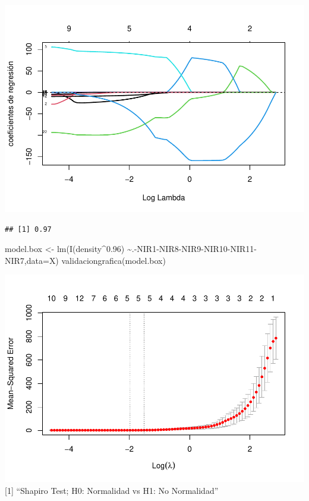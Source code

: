 \documentclass[
]{article}
\newenvironment{Shaded}{\begin{snugshade}}{\end{snugshade}}
\newcommand{\AttributeTok}[1]{\textcolor[rgb]{0.77,0.63,0.00}{#1}}
\newcommand{\FloatTok}[1]{\textcolor[rgb]{0.00,0.00,0.81}{#1}}
\newcommand{\FunctionTok}[1]{\textcolor[rgb]{0.00,0.00,0.00}{#1}}
\newcommand{\NormalTok}[1]{#1}
\newcommand{\OtherTok}[1]{\textcolor[rgb]{0.56,0.35,0.01}{#1}}
\newcommand{\SpecialCharTok}[1]{\textcolor[rgb]{0.00,0.00,0.00}{#1}}
\begin{document}
\includegraphics{Taller-2-Regresion-Multiple-Aplicada_files/figure-latex/unnamed-chunk-6-1.pdf}

\begin{verbatim}
## [1] 0.97
\end{verbatim}

\begin{Shaded}
\begin{Highlighting}[]
\NormalTok{model.box }\OtherTok{\textless{}{-}} \FunctionTok{lm}\NormalTok{(}\FunctionTok{I}\NormalTok{(density}\SpecialCharTok{\^{}}\FloatTok{0.96}\NormalTok{) }\SpecialCharTok{\textasciitilde{}}\NormalTok{.}\SpecialCharTok{{-}}\NormalTok{NIR1}\SpecialCharTok{{-}}\NormalTok{NIR8}\SpecialCharTok{{-}}\NormalTok{NIR9}\SpecialCharTok{{-}}\NormalTok{NIR10}\SpecialCharTok{{-}}\NormalTok{NIR11}\SpecialCharTok{{-}}\NormalTok{NIR7,}\AttributeTok{data=}\NormalTok{X)}
\FunctionTok{validaciongrafica}\NormalTok{(model.box)}
\end{Highlighting}
\end{Shaded}

\includegraphics{Taller-2-Regresion-Multiple-Aplicada_files/figure-latex/unnamed-chunk-7-1.pdf}
{[}1{]} ``Shapiro Test; H0: Normalidad vs H1: No Normalidad''
\end{document}
